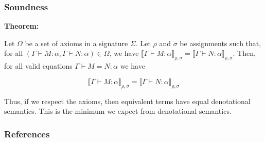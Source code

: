 \documentclass[aspectratio=169]{beamer}
\begin{document}
\begin{frame}
\frametitle{Soundness}

\textbf{Theorem:}

Let $\Omega$ be a set of axioms in a signature $\Sigma$.
Let $\rho$ and $\sigma$ be assignments such that, for all $\left(\Gamma \vdash M : \alpha, \Gamma \vdash N : \alpha\right) \in \Omega$, we have $\llbracket \Gamma \vdash M : \alpha \rrbracket_{\rho, \sigma} = \llbracket \Gamma \vdash N : \alpha \rrbracket_{\rho, \sigma}$.
Then, for all valid equations $\Gamma \vdash M = N : \alpha$ we have

\[
\llbracket \Gamma \vdash M : \alpha \rrbracket_{\rho, \sigma} = \llbracket \Gamma \vdash N : \alpha \rrbracket_{\rho, \sigma}
\]

Thus, if we respect the axioms, then equivalent terms have equal denotational semantics. This is the minimum we expect from denotational semantics.

\end{frame}


\begin{frame}
\frametitle{References}

\printbibliography
\end{frame}
\end{document}
